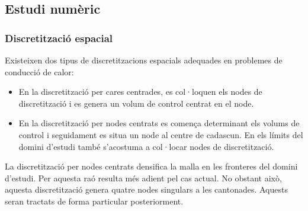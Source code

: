 
\subsection{Estudi numèric} \label{sec:estudi_numeric}


\subsubsection{Discretització espacial} \label{sec:discretitzacio_espacial}

Existeixen dos tipus de discretitzacions espacials adequades en problemes de conducció de calor:
\begin{itemize}
	\item En la discretització per cares centrades, es col·loquen els nodes de discretització i es genera un volum de control centrat en el node. 
	\item En la discretització per nodes centrats es comença determinant els volums de control i seguidament es situa un node al centre de cadascun. En els límits del domini d'estudi també s'acostuma a col·locar nodes de discretització.
\end{itemize}

\noindent
La discretització per nodes centrats densifica la malla en les fronteres del domini d'estudi. Per aquesta raó resulta més adient pel cas actual. No obstant això, aquesta discretització genera quatre nodes singulars a les cantonades. Aquests seran tractats de forma particular posteriorment.


